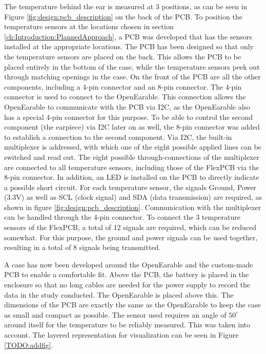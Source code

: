 The temperature behind the ear is measured at 3 positions, as can be seen in Figure \ref{fig:design:pcb_description} on the back of the PCB.
To position the temperature sensors at the locations chosen in section \ref{ch:Introduction:PlannedApproach}, a PCB was developed that has the sensors installed at the appropriate locations. 
The PCB has been designed so that only the temperature sensors are placed on the back. This allows the PCB to be placed entirely in the bottom of the case, while the temperature sensors peek out through matching openings in the case. On the front of the PCB are all the other components, including a 4-pin connector and an 8-pin connector.
The 4-pin connector is used to connect to the OpenEarable. This connection allows the OpenEarable to communicate with the PCB via I2C, as the OpenEarable also has a special 4-pin connector for this purpose.
To be able to control the second component (the earpiece) via I2C later on as well, the 8-pin connector was added to establish a connection to the second component.
Via I2C, the built-in multiplexer is addressed, with which one of the eight possible applied lines can be switched and read out. The eight possible through-connections of the multiplexer are connected to all temperature sensors, including those of the FlexPCB via the 8-pin connector.
In addition, an LED is installed on the PCB to directly indicate a possible short circuit.
For each temperature sensor, the signals Ground, Power (3.3V) as well as SCL (clock signal) and SDA (data transmission) are required, as shown in figure \ref{fig:design:pcb_description}. Communication with the multiplexer can be handled through the 4-pin connector.
To connect the 3 temperature sensors of the FlexPCB, a total of 12 signals are required, which can be reduced somewhat. For this purpose, the ground and power signals can be used together, resulting in a total of 8 signals being transmitted.

A case has now been developed around the OpenEarable and the custom-made PCB to enable a comfortable fit.
Above the PCB, the battery is placed in the enclosure so that no long cables are needed for the power supply to record the data in the study conducted.
The OpenEarable is placed above this.
The dimensions of the PCB are exactly the same as the OpenEarable to keep the case as small and compact as possible.
The sensor used requires an angle of $ 50 ^ \circ$ around itself for the temperature to be reliably measured. 
This was taken into account.
The layered representation for visualization can be seen in Figure \ref{TODO:addfig}.

